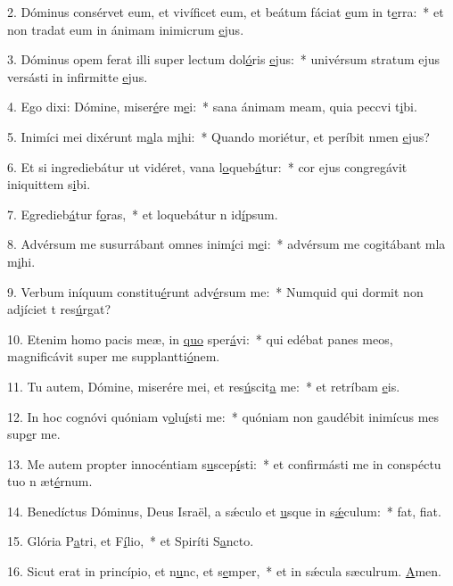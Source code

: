 2. Dóminus consérvet eum, et vivíficet eum, et beátum fáciat \uline{e}um in t\uline{e}rra:~* et non tradat eum in ánimam inimicrum \uline{e}jus.\par 
3. Dóminus opem ferat illi super lectum dol\uline{ó}ris \uline{e}jus:~* univérsum stratum ejus versásti in infirmitte \uline{e}jus.\par 
4. Ego dixi: Dómine, miser\uline{é}re m\uline{e}i:~* sana ánimam meam, quia peccvi t\uline{i}bi.\par 
5. Inimíci mei dixérunt m\uline{a}la m\uline{i}hi:~* Quando moriétur, et períbit nmen \uline{e}jus?\par 
6. Et si ingrediebátur ut vidéret, vana l\uline{o}queb\uline{á}tur:~* cor ejus congregávit iniquittem s\uline{i}bi.\par 
7. Egredieb\uline{á}tur f\uline{o}ras,~* et loquebátur n id\uline{í}psum.\par 
8. Advérsum me susurrábant omnes inim\uline{í}ci m\uline{e}i:~* advérsum me cogitábant mla m\uline{i}hi.\par 
9. Verbum iníquum constitu\uline{é}runt adv\uline{é}rsum me:~* Numquid qui dormit non adjíciet t res\uline{ú}rgat?\par 
10. Etenim homo pacis meæ, in \uline{quo} sper\uline{á}vi:~* qui edébat panes meos, magnificávit super me supplantti\uline{ó}nem.\par 
11. Tu autem, Dómine, miserére mei, et res\uline{ú}scit\uline{a} me:~* et retríbam \uline{e}is.\par 
12. In hoc cognóvi quóniam v\uline{o}lu\uline{í}sti me:~* quóniam non gaudébit inimícus mes sup\uline{e}r me.\par 
13. Me autem propter innocéntiam s\uline{u}scep\uline{í}sti:~* et confirmásti me in conspéctu tuo n æt\uline{é}rnum.\par 
14. Benedíctus Dóminus, Deus Israël, a sǽculo et \uline{u}sque in s\uline{ǽ}culum:~* fat, f\uline{i}at.\par 
15. Glória P\uline{a}tri, et F\uline{í}lio,~* et Spiríti S\uline{a}ncto.\par 
16. Sicut erat in princípio, et n\uline{u}nc, et s\uline{e}mper,~* et in sǽcula sæculrum. \uline{A}men.\par 
